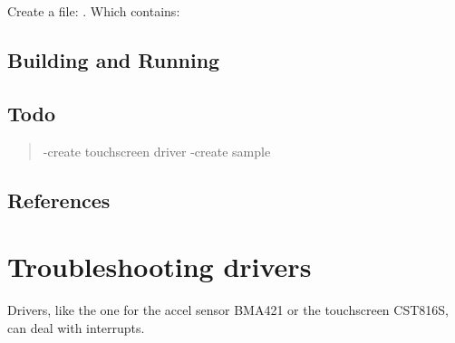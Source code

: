 \documentclass[letterpaper,10pt,english]{sphinxmanual}
\begin{document}
\begin{sphinxVerbatim}[commandchars=\\\{\}]
\end{sphinxVerbatim}

Create a file: .
Which contains:

\begin{sphinxVerbatim}[commandchars=\\\{\}]
 
 
        
        
\end{sphinxVerbatim}


\subsection{Building and Running}
\label{\detokenize{behind/touchscreen:building-and-running}}

\subsection{Todo}
\label{\detokenize{behind/touchscreen:todo}}\begin{quote}

-create touchscreen driver
-create sample
\end{quote}


\subsection{References}
\label{\detokenize{behind/touchscreen:references}}

\section{Troubleshooting drivers}
\label{\detokenize{behind/troubleshoot:troubleshooting-drivers}}\label{\detokenize{behind/troubleshoot::doc}}
Drivers, like the one for the accel sensor BMA421 or the touchscreen CST816S, can deal with interrupts.
\end{document}
